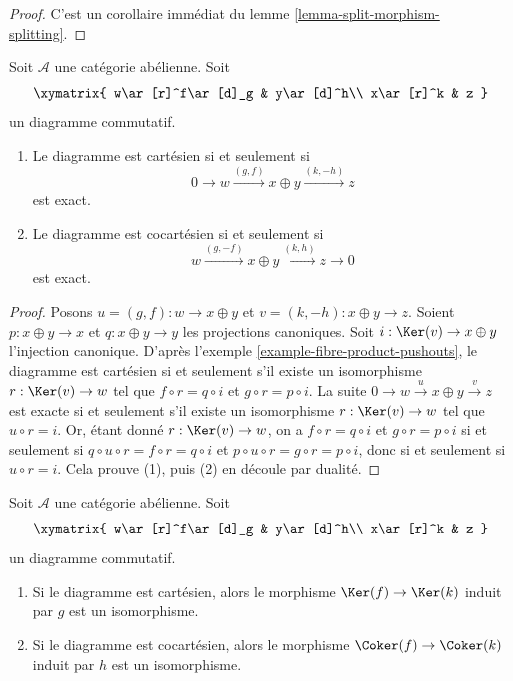 \begin{proof}
C'est un corollaire immédiat du lemme \ref{lemma-split-morphism-splitting}.
\end{proof}

\begin{lemma}
\label{lemma-characterize-cartesian}
Soit $\mathcal{A}$ une catégorie abélienne. Soit
$$
\xymatrix{
w\ar[r]^f\ar[d]_g
& y\ar[d]^h\\
x\ar[r]^k
& z
}
$$
un diagramme commutatif. 
\begin{enumerate}
\item Le diagramme est cartésien si et seulement si 
$$
0 \to w \xrightarrow{(g, f)} x \oplus y \xrightarrow{(k, -h)} z
$$
est exact.
\item Le diagramme est cocartésien si et seulement si 
$$
w \xrightarrow{(g, -f)} x \oplus y \xrightarrow{(k, h)} z \to 0
$$
est exact.
\end{enumerate}
\end{lemma}

\begin{proof}
Posons $u = (g, f) : w \to x \oplus y$ et $v = (k, -h) : x \oplus y \to z$. 
Soient $p : x \oplus y \to x$ et $q : x \oplus y \to y$ les projections 
canoniques. Soit $i : \Ker(v) \to x \oplus y$ l'injection 
canonique. D'après l'exemple \ref{example-fibre-product-pushouts}, le diagramme est 
cartésien si et seulement s'il existe un isomorphisme 
$r : \Ker(v) \to w$ tel que $f \circ r = q \circ i$ et 
$g \circ r = p \circ i$. La suite 
$0 \to w \overset{u} \to x \oplus y \overset{v} \to z$ est exacte si et 
seulement s'il existe un isomorphisme $r : \Ker(v) \to w$ tel que 
$u \circ r = i$. Or, étant donné $r : \Ker(v) \to w$, on a 
$f \circ r = q \circ i$ et $g \circ r = p \circ i$ si et 
seulement si $q \circ u \circ r= f \circ r = q \circ i$ et 
$p \circ u \circ r = g \circ r = p \circ i$, donc si et seulement si
$u \circ r = i$. Cela prouve (1), puis (2) en découle par dualité. 
\end{proof}

\begin{lemma}
\label{lemma-cartesian-kernel}
Soit $\mathcal{A}$ une catégorie abélienne. Soit
$$
\xymatrix{
w\ar[r]^f\ar[d]_g
& y\ar[d]^h\\
x\ar[r]^k
& z
}
$$
un diagramme commutatif.
\begin{enumerate}
\item Si le diagramme est cartésien, alors le morphisme 
$\Ker(f)\to\Ker(k)$ induit par $g$ est un isomorphisme.
\item Si le diagramme est cocartésien, alors le morphisme 
$\Coker(f)\to\Coker(k)$ induit par $h$ est un isomorphisme.
\end{enumerate}
\end{lemma}

